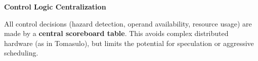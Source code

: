 \highspace
\begin{flushleft}
    \textcolor{Green3}{ \textbf{Control Logic Centralization}}
\end{flushleft}
All control decisions (hazard detection, operand availability, resource usage) are made by a \textbf{central scoreboard table}. This avoids complex distributed hardware (as in Tomasulo), but limits the potential for speculation or aggressive scheduling.